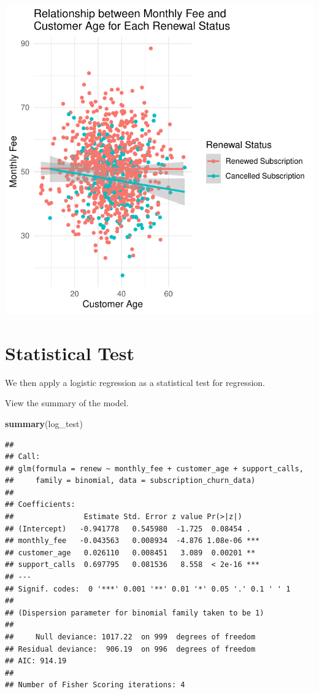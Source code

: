 \documentclass[
]{article}
\newenvironment{Shaded}{\begin{snugshade}}{\end{snugshade}}
\newcommand{\FunctionTok}[1]{\textcolor[rgb]{0.13,0.29,0.53}{\textbf{#1}}}
\newcommand{\NormalTok}[1]{#1}
\begin{document}
\includegraphics{3_logistic_regression_files/figure-latex/scatter_plot_3-1.pdf}

\section{Statistical Test}\label{statistical-test}

We then apply a logistic regression as a statistical test for
regression.

View the summary of the model.

\begin{Shaded}
\begin{Highlighting}[]
\FunctionTok{summary}\NormalTok{(log\_test)}
\end{Highlighting}
\end{Shaded}

\begin{verbatim}
## 
## Call:
## glm(formula = renew ~ monthly_fee + customer_age + support_calls, 
##     family = binomial, data = subscription_churn_data)
## 
## Coefficients:
##                Estimate Std. Error z value Pr(>|z|)    
## (Intercept)   -0.941778   0.545980  -1.725  0.08454 .  
## monthly_fee   -0.043563   0.008934  -4.876 1.08e-06 ***
## customer_age   0.026110   0.008451   3.089  0.00201 ** 
## support_calls  0.697795   0.081536   8.558  < 2e-16 ***
## ---
## Signif. codes:  0 '***' 0.001 '**' 0.01 '*' 0.05 '.' 0.1 ' ' 1
## 
## (Dispersion parameter for binomial family taken to be 1)
## 
##     Null deviance: 1017.22  on 999  degrees of freedom
## Residual deviance:  906.19  on 996  degrees of freedom
## AIC: 914.19
## 
## Number of Fisher Scoring iterations: 4
\end{verbatim}
\end{document}
